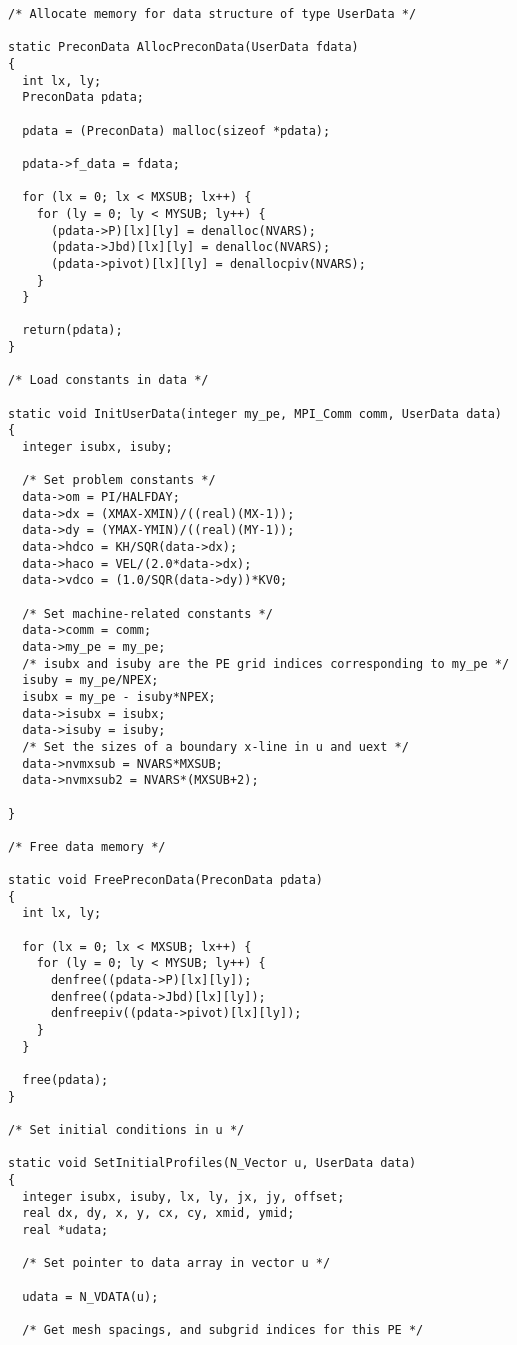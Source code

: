 \begin{verbatim}
/* Allocate memory for data structure of type UserData */

static PreconData AllocPreconData(UserData fdata)
{
  int lx, ly;
  PreconData pdata;

  pdata = (PreconData) malloc(sizeof *pdata);

  pdata->f_data = fdata;

  for (lx = 0; lx < MXSUB; lx++) {
    for (ly = 0; ly < MYSUB; ly++) {
      (pdata->P)[lx][ly] = denalloc(NVARS);
      (pdata->Jbd)[lx][ly] = denalloc(NVARS);
      (pdata->pivot)[lx][ly] = denallocpiv(NVARS);
    }
  }

  return(pdata);
}

/* Load constants in data */

static void InitUserData(integer my_pe, MPI_Comm comm, UserData data)
{
  integer isubx, isuby;

  /* Set problem constants */
  data->om = PI/HALFDAY;
  data->dx = (XMAX-XMIN)/((real)(MX-1));
  data->dy = (YMAX-YMIN)/((real)(MY-1));
  data->hdco = KH/SQR(data->dx);
  data->haco = VEL/(2.0*data->dx);
  data->vdco = (1.0/SQR(data->dy))*KV0;

  /* Set machine-related constants */
  data->comm = comm;
  data->my_pe = my_pe;
  /* isubx and isuby are the PE grid indices corresponding to my_pe */
  isuby = my_pe/NPEX;
  isubx = my_pe - isuby*NPEX;
  data->isubx = isubx;
  data->isuby = isuby;
  /* Set the sizes of a boundary x-line in u and uext */
  data->nvmxsub = NVARS*MXSUB;
  data->nvmxsub2 = NVARS*(MXSUB+2);

}

/* Free data memory */

static void FreePreconData(PreconData pdata)
{
  int lx, ly;

  for (lx = 0; lx < MXSUB; lx++) {
    for (ly = 0; ly < MYSUB; ly++) {
      denfree((pdata->P)[lx][ly]);
      denfree((pdata->Jbd)[lx][ly]);
      denfreepiv((pdata->pivot)[lx][ly]);
    }
  }

  free(pdata);
}

/* Set initial conditions in u */

static void SetInitialProfiles(N_Vector u, UserData data)
{
  integer isubx, isuby, lx, ly, jx, jy, offset;
  real dx, dy, x, y, cx, cy, xmid, ymid;
  real *udata;

  /* Set pointer to data array in vector u */

  udata = N_VDATA(u);

  /* Get mesh spacings, and subgrid indices for this PE */


\end{verbatim}
